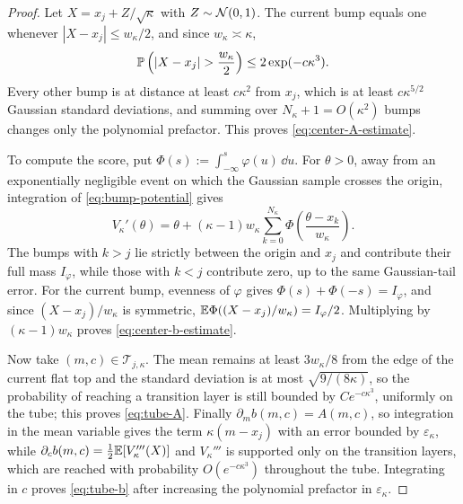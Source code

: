\begin{proof}
    Let $X=x_j+Z/\sqrt\kappa$ with $Z\sim\mathcal{N}(0,1)$. The current bump equals one whenever
    $|X-x_j|\leq w_\kappa/2$, and since $w_\kappa\asymp\kappa$,
    \begin{equation*}
        \Prob\left(|X-x_j|>\frac{w_\kappa}2\right)\leq2\exp(-c\kappa^3).
    \end{equation*}
    Every other bump is at distance at least $c\kappa^2$ from $x_j$, which is at least
    $c\kappa^{5/2}$ Gaussian standard deviations, and summing over $N_\kappa+1=O(\kappa^2)$
    bumps changes only the polynomial prefactor. This proves
    \eqref{eq:center-A-estimate}.

    To compute the score, put $\Phi(s):=\int_{-\infty}^s\varphi(u)\,\dd u$. For $\theta>0$,
    away from an exponentially negligible event on which the Gaussian sample crosses the
    origin, integration of \eqref{eq:bump-potential} gives
    \begin{equation*}
        V_\kappa'(\theta)
        =\theta+(\kappa-1)w_\kappa\sum_{k=0}^{N_\kappa}
          \Phi\left(\frac{\theta-x_k}{w_\kappa}\right).
    \end{equation*}
    The bumps with $k>j$ lie strictly between the origin and $x_j$ and contribute their full
    mass $I_\varphi$, while those with $k<j$ contribute zero, up to the same Gaussian-tail
    error. For the current bump, evenness of $\varphi$ gives $\Phi(s)+\Phi(-s)=I_\varphi$, and
    since $(X-x_j)/w_\kappa$ is symmetric,
    $\mathbb{E}\Phi((X-x_j)/w_\kappa)=I_\varphi/2$. Multiplying by $(\kappa-1)w_\kappa$ proves
    \eqref{eq:center-b-estimate}.

    Now take $(m,c)\in\mathcal T_{j,\kappa}$. The mean remains at least $3w_\kappa/8$ from the
    edge of the current flat top and the standard deviation is at most
    $\sqrt{9/(8\kappa)}$, so the probability of reaching a transition layer is still bounded by
    $Ce^{-c\kappa^3}$, uniformly on the tube; this proves \eqref{eq:tube-A}. Finally
    $\partial_mb(m,c)=A(m,c)$, so integration in the mean variable gives the term
    $\kappa(m-x_j)$ with an error bounded by $\varepsilon_\kappa$, while
    $\partial_cb(m,c)=\tfrac12\mathbb{E}[V_\kappa'''(X)]$ and $V_\kappa'''$ is supported only on the
    transition layers, which are reached with probability $O(e^{-c\kappa^3})$ throughout the
    tube. Integrating in $c$ proves \eqref{eq:tube-b} after increasing the polynomial prefactor
    in $\varepsilon_\kappa$.
\end{proof}

